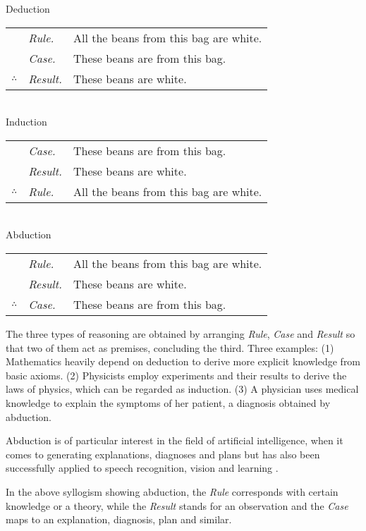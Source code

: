 \documentclass[a4paper]{article}
\begin{document}
\begin{center}
Deduction\\[2mm]
\begin{tabular}{cll}
             & \emph{Rule.}   & All the beans from this bag are white.\\
             & \emph{Case.}   & These beans are from this bag.\\
$\therefore$ & \emph{Result.} & These beans are white.
\end{tabular}\\[4mm]

Induction\\[2mm]
\begin{tabular}{cll}
             & \emph{Case.}   & These beans are from this bag.\\
             & \emph{Result.} & These beans are white.\\
$\therefore$ & \emph{Rule.}   & All the beans from this bag are white.
\end{tabular}\\[4mm]

Abduction\\[2mm]
\begin{tabular}{cll}
             & \emph{Rule.}   & All the beans from this bag are white.\\
             & \emph{Result.} & These beans are white.\\
$\therefore$ & \emph{Case.}   & These beans are from this bag.
\end{tabular}
\end{center}

The three types of reasoning are obtained by arranging \emph{Rule}, \emph{Case} and \emph{Result} so that two of them act as premises, concluding the third. Three examples: (1) Mathematics heavily depend on deduction to derive more explicit knowledge from basic axioms. (2) Physicists employ experiments and their results to derive the laws of physics, which can be regarded as induction. (3) A physician uses medical knowledge to explain the symptoms of her patient, a diagnosis obtained by abduction.

Abduction is of particular interest in the field of artificial intelligence, when it comes to generating explanations, diagnoses and plans but has also been successfully applied to speech recognition, vision and learning \cite[Introductions]{DBLP:journals/logcom/ConsoleDT91,DBLP:journals/tcs/EiterGL97}.

In the above syllogism showing abduction, the \emph{Rule} corresponds with certain knowledge or a theory, while the \emph{Result} stands for an observation and the \emph{Case} maps to an explanation, diagnosis, plan and similar.
\end{document}
